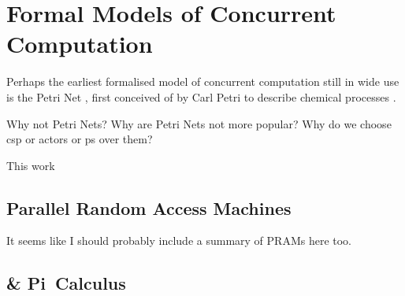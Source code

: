 \section{Formal Models of Concurrent Computation}
Perhaps the earliest formalised model of concurrent computation still in wide use is the Petri Net \cite{Dennis2011}, first conceived of by Carl Petri to describe chemical processes \cite{Petri2008}.

\begin{anfxerror}{Why not Petri Nets?}
Why are Petri Nets not more popular?  Why do we choose \gls{csp} or \glspl{actor} or \gls{ps} over them?
\end{anfxerror}

\cite{Varela2013}

This work 

\subsection{Parallel Random Access Machines}
It seems like I should probably include a summary of PRAMs here too.

\subsection{ \& Pi~Calculus}


